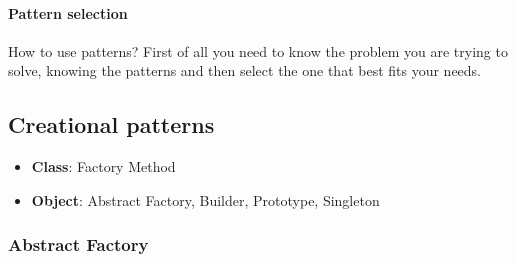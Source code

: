 \paragraph{Pattern selection}
How to use patterns? First of all you need to know the problem you
are trying to solve, knowing the patterns and then select the one that
best fits your needs.

\subsection{Creational patterns}

\vspace{0.5cm}
\noindent\begin{minipage}{\linewidth}
  \begin{minipage}[t]{0.35\linewidth}
    \begin{itemize}
      \item \textbf{Class}: Factory Method
    \end{itemize}
  \end{minipage}%
  \hfill
  \begin{minipage}[t]{0.65\linewidth}
    \begin{itemize}
      \item \textbf{Object}: Abstract Factory, Builder, Prototype, Singleton

    \end{itemize}
  \end{minipage}
\end{minipage}

\subsubsection{Abstract Factory}




